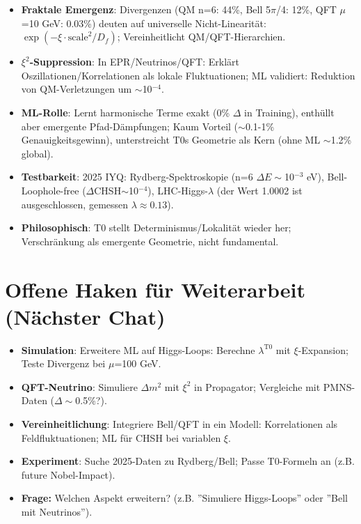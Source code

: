	\begin{itemize}
		\item \textbf{Fraktale Emergenz}: Divergenzen (QM n=6: 44\%, Bell 5$\pi$/4: 12\%, QFT $\mu$=10 GeV: 0.03\%) deuten auf universelle Nicht-Linearität: $\exp(-\xi \cdot \text{scale}^2 / D_f)$; Vereinheitlicht QM/QFT-Hierarchien.
		\item \textbf{$\xi^2$-Suppression}: In EPR/Neutrinos/QFT: Erklärt Oszillationen/Korrelationen als lokale Fluktuationen; ML validiert: Reduktion von QM-Verletzungen um $\sim$10$^{-4}$.
		\item \textbf{ML-Rolle}: Lernt harmonische Terme exakt (0\% $\Delta$ in Training), enthüllt aber emergente Pfad-Dämpfungen; Kaum Vorteil ($\sim$0.1-1\% Genauigkeitsgewinn), unterstreicht T0s Geometrie als Kern (ohne ML $\sim$1.2\% global).
		\item \textbf{Testbarkeit}: 2025 IYQ: Rydberg-Spektroskopie (n=6 $\Delta E\sim$10$^{-3}$ eV), Bell-Loophole-free ($\Delta$CHSH$\sim$10$^{-4}$), LHC-Higgs-$\lambda$ (der Wert 1.0002 ist ausgeschlossen, gemessen $\lambda \approx 0.13$).
		\item \textbf{Philosophisch}: T0 stellt Determinismus/Lokalität wieder her; Verschränkung als emergente Geometrie, nicht fundamental.
	\end{itemize}
	
	\section{Offene Haken für Weiterarbeit (Nächster Chat)}
	
	\begin{itemize}
		\item \textbf{Simulation}: Erweitere ML auf Higgs-Loops: Berechne $\lambda^{\text{T0}}$ mit $\xi$-Expansion; Teste Divergenz bei $\mu$=100 GeV.
		\item \textbf{QFT-Neutrino}: Simuliere $\Delta m^2$ mit $\xi^2$ in Propagator; Vergleiche mit PMNS-Daten ($\Delta\sim$0.5\%?).
		\item \textbf{Vereinheitlichung}: Integriere Bell/QFT in ein Modell: Korrelationen als Feldfluktuationen; ML für CHSH bei variablen $\xi$.
		\item \textbf{Experiment}: Suche 2025-Daten zu Rydberg/Bell; Passe T0-Formeln an (z.B. future Nobel-Impact).
		\item \textbf{Frage:} Welchen Aspekt erweitern? (z.B. ''Simuliere Higgs-Loops'' oder ''Bell mit Neutrinos'').
	\end{itemize}
	
